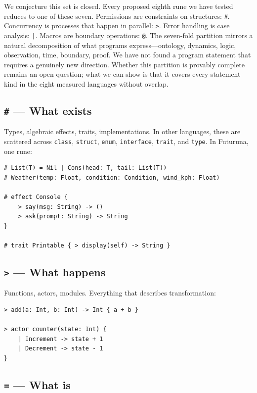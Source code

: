 \documentclass[11pt,a4paper]{article}
\begin{document}
We conjecture this set is closed. Every proposed eighth rune we have tested reduces to one of these seven. Permissions are constraints on structures: \texttt{\#}. Concurrency is processes that happen in parallel: \texttt{>}. Error handling is case analysis: \texttt{|}. Macros are boundary operations: \texttt{@}. The seven-fold partition mirrors a natural decomposition of what programs express---ontology, dynamics, logic, observation, time, boundary, proof. We have not found a program statement that requires a genuinely new direction. Whether this partition is provably complete remains an open question; what we can show is that it covers every statement kind in the eight measured languages without overlap.

\subsection{\texttt{\#} --- What exists}

Types, algebraic effects, traits, implementations. In other languages, these are scattered across \texttt{class}, \texttt{struct}, \texttt{enum}, \texttt{interface}, \texttt{trait}, and \texttt{type}. In Futuruna, one rune:

\begin{lstlisting}
# List(T) = Nil | Cons(head: T, tail: List(T))
# Weather(temp: Float, condition: Condition, wind_kph: Float)

# effect Console {
    > say(msg: String) -> ()
    > ask(prompt: String) -> String
}

# trait Printable { > display(self) -> String }
\end{lstlisting}

\subsection{\texttt{>} --- What happens}

Functions, actors, modules. Everything that describes transformation:

\begin{lstlisting}
> add(a: Int, b: Int) -> Int { a + b }

> actor counter(state: Int) {
    | Increment -> state + 1
    | Decrement -> state - 1
}
\end{lstlisting}

\subsection{\texttt{=} --- What is}
\end{document}
